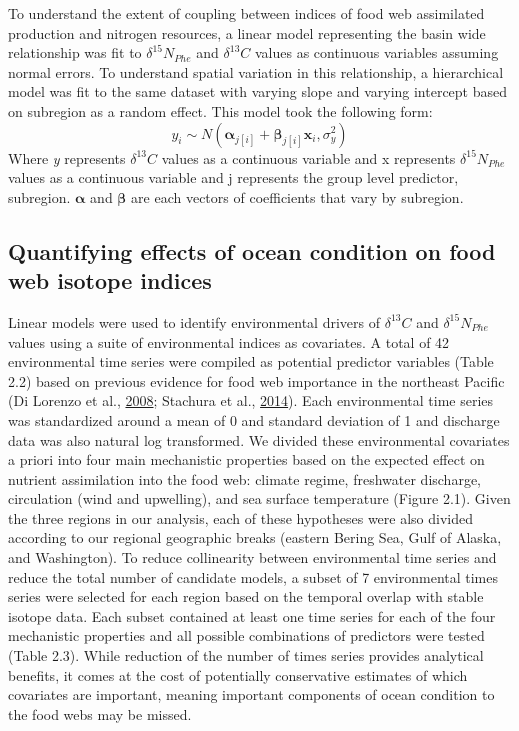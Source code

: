 \documentclass [11pt, proquest] {uwthesis}[2015/03/03]
\begin{document}
To understand the extent of coupling between indices of food web
assimilated production and nitrogen resources, a linear model
representing the basin wide relationship was fit to
\(\delta^{15}N_{Phe}\) and \(\delta^{13}C\) values as continuous
variables assuming normal errors. To understand spatial variation in
this relationship, a hierarchical model was fit to the same dataset with
varying slope and varying intercept based on subregion as a random
effect. This model took the following form:
\begin{equation} 
 y_i \sim N(\boldsymbol{\alpha}_{j[i]} + \boldsymbol{\beta}_{j[i]}\boldsymbol{x}_i, \sigma^2_y)
  \label{eq:hiermods}
\end{equation}
Where \emph{y} represents \(\delta^{13}C\) values as a continuous
variable and x represents \(\delta^{15}N_{Phe}\) values as a continuous
variable and j represents the group level predictor, subregion.
\(\boldsymbol{\alpha}\) and \(\boldsymbol{\beta}\) are each vectors of
coefficients that vary by subregion.

\subsection{Quantifying effects of ocean condition on food web isotope
indices}\label{quantifying-effects-of-ocean-condition-on-food-web-isotope-indices}

Linear models were used to identify environmental drivers of
\(\delta^{13}C\) and \(\delta^{15}N_{Phe}\) values using a suite of
environmental indices as covariates. A total of 42 environmental time
series were compiled as potential predictor variables (Table 2.2) based
on previous evidence for food web importance in the northeast Pacific
(Di Lorenzo et al., \protect\hyperlink{ref-DiLorenzo2008}{2008};
Stachura et al., \protect\hyperlink{ref-Stachura2014}{2014}). Each
environmental time series was standardized around a mean of 0 and
standard deviation of 1 and discharge data was also natural log
transformed. We divided these environmental covariates a priori into
four main mechanistic properties based on the expected effect on
nutrient assimilation into the food web: climate regime, freshwater
discharge, circulation (wind and upwelling), and sea surface temperature
(Figure 2.1). Given the three regions in our analysis, each of these
hypotheses were also divided according to our regional geographic breaks
(eastern Bering Sea, Gulf of Alaska, and Washington). To reduce
collinearity between environmental time series and reduce the total
number of candidate models, a subset of 7 environmental times series
were selected for each region based on the temporal overlap with stable
isotope data. Each subset contained at least one time series for each of
the four mechanistic properties and all possible combinations of
predictors were tested (Table 2.3). While reduction of the number of
times series provides analytical benefits, it comes at the cost of
potentially conservative estimates of which covariates are important,
meaning important components of ocean condition to the food webs may be
missed.
\end{document}
